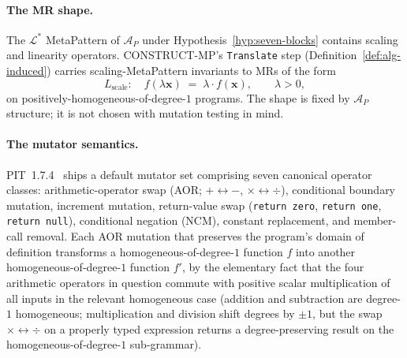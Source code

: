 \documentclass[acmsmall,screen,review]{acmart}
\begin{document}
\paragraph{The MR shape.}
The $\mathcal{L}^{*}$ MetaPattern of $\mathcal{A}_P$ under
Hypothesis~\ref{hyp:seven-blocks} contains scaling and linearity
operators. CONSTRUCT-MP's \texttt{Translate} step
(Definition~\ref{def:alg-induced}) carries scaling-MetaPattern invariants
to MRs of the form
\begin{equation}
\label{eq:l-scale-shape}
L_{\mathrm{scale}}: \quad f(\lambda \mathbf{x}) \;=\; \lambda \cdot f(\mathbf{x}),
\qquad \lambda > 0,
\end{equation}
on positively-homogeneous-of-degree-$1$ programs. The shape is fixed
by $\mathcal{A}_P$ structure; it is not chosen with mutation testing
in mind.

\paragraph{The mutator semantics.}
PIT~1.7.4~\cite{Coles2016PIT} ships a default mutator set comprising
seven canonical operator classes: arithmetic-operator swap (AOR;
$+ \leftrightarrow -$, $\times \leftrightarrow \div$), conditional
boundary mutation, increment mutation, return-value swap (\texttt{return zero},
\texttt{return one}, \texttt{return null}), conditional negation
(NCM), constant replacement, and member-call removal. Each AOR
mutation that preserves the program's domain of definition transforms
a homogeneous-of-degree-$1$ function $f$ into another
homogeneous-of-degree-$1$ function $f'$, by the elementary fact that
the four arithmetic operators in question commute with positive
scalar multiplication of all inputs in the relevant homogeneous case
(addition and subtraction are degree-$1$ homogeneous; multiplication
and division shift degrees by $\pm 1$, but the swap $\times
\leftrightarrow \div$ on a properly typed expression returns a
degree-preserving result on the homogeneous-of-degree-$1$
sub-grammar).
\end{document}

